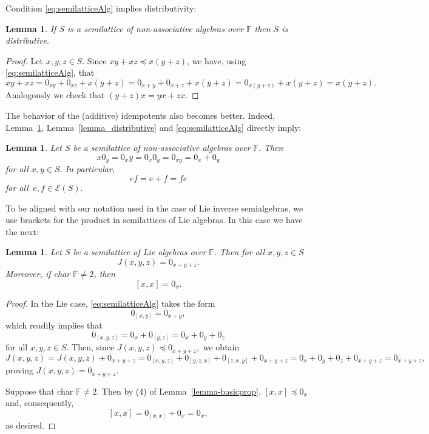 \documentclass{amsart}
\newcommand{\E}{\mathcal{E}}
\newcommand{\F}{\mathbb{F}}
\newcommand{\0}{{\vartheta}}
\newtheorem{lem}[thm]{Lemma}
\theoremstyle{definition}
\newtheorem{defn}[thm]{Definition}
\theoremstyle{remark}
\numberwithin{equation}{section}
\newtheorem*{Theorem A}{\textbf{Theorem A}}
\newtheorem*{Corollary E}{\textbf{Corollary E}}
\newtheorem*{Corollary F}{\textbf{Corollary F}}
\newtheorem*{Theorem B}{\textbf{Theorem B}}
\newtheorem*{Theorem C}{\textbf{Theorem C}}
\newtheorem*{Theorem D}{\textbf{Theorem B}}
\newtheorem*{p a}{\textbf{Proof of  Theorem A}}
\newtheorem*{p b}{\textbf{Proof of Theorem B}}
\newtheorem*{p c}{\textbf{Proof of  Theorem C}}
\newtheorem*{p d}{\textbf{Proof of  Theorem D}}
\begin{document}
Condition \eqref{eq:semilatticeAlg} implies distributivity:

\begin{lem}\label{lemma1_SemilatticeAlg}
If $S$ is a semilattice of non-associative algebras over
$\F$ then $S$ is distributive. 
 \end{lem}
 \begin{proof}
  Let $x,y,z\in S.$ Since $xy+xz\preceq x(y+z)$,  we have, using \eqref{eq:semilatticeAlg}, that $$xy+xz= 0_{xy}+0_{xz}+x(y+z)=0_{x+y}+ 0_{x+z}+x(y+z)= 0_{x(y+z)}+ x(y+z)=x(y+z).$$ 
Analogously we check that $(y+z)x=yx+zx.$
\end{proof}

The behavior of the (additive) idempotents also becomes better. Indeed,  Lemma~\ref{lemma1_SemilatticeAlg}, Lemma~\ref{lemma_distributive} and \eqref{eq:semilatticeAlg} directly imply:

\begin{lem}\label{lemma2_SemilatticeAlg} 
Let $S$ be a semilattice of non-associative algebras over
$\F .$ Then 
$$ x 0_y = 0_x y = 0_x 0_y = 0_{xy} = 0_x + 0_y$$  
for all $ x,y \in S.$ In particular, 
$$ef=e+f = fe $$ 
for all $\, e,f \in \E (S).$
     \end{lem}



To be aligned with our notation  used in the case of Lie inverse semialgebras, we use brackets for the product in semilattices of Lie algebras.  In this case we have the next:
\begin{lem}\label{lemma_SemilatticeLieAlg} Let $S$ be a semilattice of Lie algebras over  $\F .$ Then for all $x, y , z\in S$
    $$  J(x,y,z) = 0_{x+y+z}. $$
    Moreover,  if {\rm char} $ \F \neq 2$, then 
    $$[x,x] = 0_x .$$
\end{lem}
\begin{proof} In the Lie case, \eqref{eq:semilatticeAlg} takes the form $$0_{[x,y]} = 0_{x + y},$$ which readily implies that 
    $$0_{[x,y,z]} =  0_{x} +0_{[y,z]} =0_{x} +0_y + 0_z $$ for all $x,y, z\in S.$ Then, since 
    $J(x,y,z)\preceq 0_{x+y+z},$ we obtain
$$J(x,y,z) = J(x,y,z) + 0_{x+y+z}=
0_{[x,y,z]} + 0_{[y,z,x]}+0_{[z,x,y]} + 0_{x+y+z}
=0_{x} +0_y + 0_z  + 0_{x+y+z} = 0_{x+y+z},$$
proving   $J(x,y,z) = 0_{x+y+z}.$ 

Suppose that  {\rm char} $ \F \neq 2 .$ Then by  (4) of Lemma~\ref{lemma-basicprop}, $[x,x] \preceq 0_x $ and, consequently,  
$$[x,x] = 0_{[x,x]} + 0_x  = 0_x,$$ as desired.
\end{proof}
\end{document}
